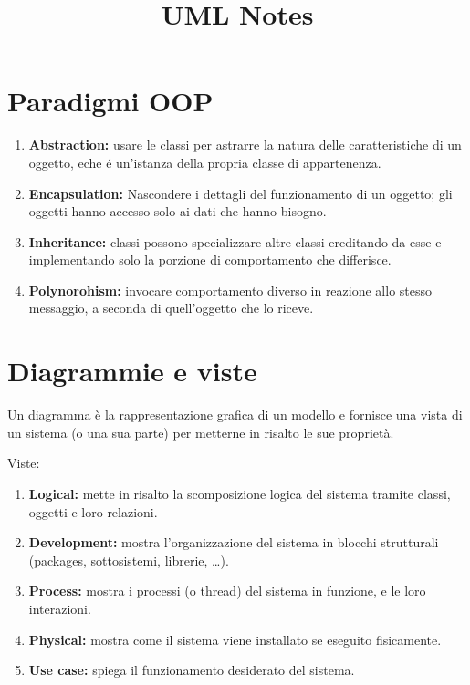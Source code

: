 \documentclass[]{article}
\title{UML Notes}
\author{}
\date{}
\begin{document}
\maketitle

\hypertarget{paradigmi-oop}{%
\section{Paradigmi OOP}\label{paradigmi-oop}}

\begin{enumerate}
\def\labelenumi{\arabic{enumi}.}
\item
  \textbf{Abstraction:} usare le classi per astrarre la natura delle
  caratteristiche di un oggetto, eche é un'istanza della propria classe
  di appartenenza.
\item
  \textbf{Encapsulation:} Nascondere i dettagli del funzionamento di un
  oggetto; gli oggetti hanno accesso solo ai dati che hanno bisogno.
\item
  \textbf{Inheritance:} classi possono specializzare altre classi
  ereditando da esse e implementando solo la porzione di comportamento
  che differisce.
\item
  \textbf{Polynorohism:} invocare comportamento diverso in reazione allo
  stesso messaggio, a seconda di quell'oggetto che lo riceve.
\end{enumerate}

\hypertarget{diagrammie-e-viste}{%
\section{Diagrammie e viste}\label{diagrammie-e-viste}}

Un diagramma è la rappresentazione grafica di un modello e fornisce una
vista di un sistema (o una sua parte) per metterne in risalto le sue
proprietà.

Viste:

\begin{enumerate}
\def\labelenumi{\arabic{enumi}.}
\item
  \textbf{Logical:} mette in risalto la scomposizione logica del sistema
  tramite classi, oggetti e loro relazioni.
\item
  \textbf{Development:} mostra l'organizzazione del sistema in blocchi
  strutturali (packages, sottosistemi, librerie, \ldots).
\item
  \textbf{Process:} mostra i processi (o thread) del sistema in
  funzione, e le loro interazioni.
\item
  \textbf{Physical:} mostra come il sistema viene installato se eseguito
  fisicamente.
\item
  \textbf{Use case:} spiega il funzionamento desiderato del sistema.
\end{enumerate}
\end{document}
